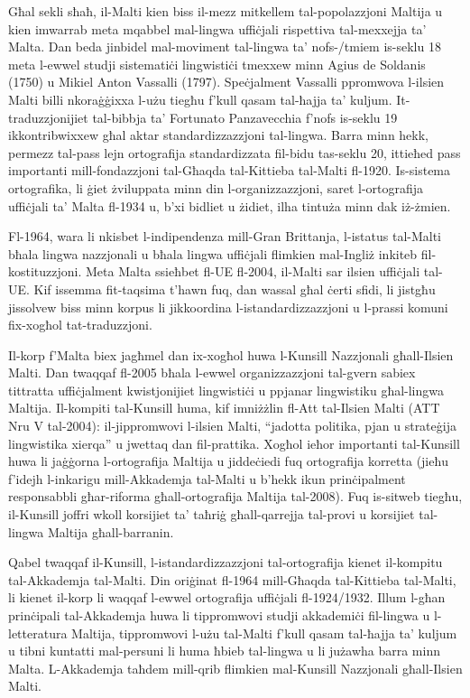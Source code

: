 \documentclass[]{../../metanetpaper}
\begin{document}
\begin{multicols}{2}
Għal sekli sħaħ, il-Malti kien biss il-mezz mitkellem tal-popolazzjoni Maltija u kien imwarrab meta mqabbel mal-lingwa uffiċjali rispettiva tal-mexxejja ta’ Malta. Dan beda jinbidel mal-moviment tal-lingwa ta’ nofs-/tmiem is-seklu 18 meta l-ewwel studji sistematiċi lingwistiċi tmexxew minn Agius de Soldanis (1750) u Mikiel Anton Vassalli (1797). Speċjalment Vassalli ppromwova l-ilsien Malti billi nkoraġġixxa l-użu tiegħu f'kull qasam tal-ħajja ta’ kuljum. It-traduzzjonijiet tal-bibbja ta’ Fortunato Panzavecchia f’nofs is-seklu 19 ikkontribwixxew għal aktar standardizzazzjoni tal-lingwa. Barra minn hekk, permezz tal-pass lejn ortografija standardizzata fil-bidu tas-seklu 20, ittieħed pass  importanti mill-fondazzjoni tal-Għaqda tal-Kittieba tal-Malti fl-1920. Is-sistema ortografika, li ġiet żviluppata minn din l-organizzazzjoni, saret l-ortografija uffiċjali ta’ Malta fl-1934 u, b'xi bidliet u żidiet, ilha tintuża minn dak iż-żmien.

Fl-1964, wara li nkisbet l-indipendenza mill-Gran Brittanja, l-istatus tal-Malti bħala lingwa nazzjonali u bħala lingwa uffiċjali flimkien mal-Ingliż inkiteb fil-kostituzzjoni. Meta Malta ssieħbet fl-UE fl-2004, il-Malti sar ilsien uffiċjali tal-UE. Kif issemma fit-taqsima t’hawn fuq, dan wassal għal ċerti sfidi, li jistgħu jissolvew biss minn korpus li jikkoordina l-istandardizzazzjoni u l-prassi komuni fix-xogħol tat-traduzzjoni.

Il-korp f'Malta biex jagħmel dan ix-xogħol huwa l-Kunsill Nazzjonali għall-Ilsien Malti. Dan twaqqaf fl-2005 bħala l-ewwel organizzazzjoni tal-gvern sabiex tittratta uffiċjalment kwistjonijiet lingwistiċi u ppjanar lingwistiku għal-lingwa Maltija. Il-kompiti tal-Kunsill huma, kif imniżżlin fl-Att tal-Ilsien Malti (ATT Nru V tal-2004): il-jippromwovi l-ilsien Malti, ``jadotta politika, pjan u strateġija lingwistika xierqa'' u jwettaq dan fil-prattika. Xogħol ieħor importanti tal-Kunsill huwa li jaġġorna l-ortografija Maltija u jiddeċiedi fuq ortografija korretta (jieħu f’idejh l-inkarigu mill-Akkademja tal-Malti u b’hekk ikun prinċipalment responsabbli għar-riforma għall-ortografija Maltija tal-2008). Fuq is-sitweb tiegħu, il-Kunsill joffri wkoll korsijiet ta’ taħriġ għall-qarrejja tal-provi u korsijiet tal-lingwa Maltija għall-barranin\cite{Kunsill1}.

Qabel twaqqaf il-Kunsill, l-istandardizzazzjoni tal-ortografija kienet il-kompitu tal-Akkademja tal-Malti. Din oriġinat fl-1964 mill-Għaqda tal-Kittieba tal-Malti, li kienet il-korp li waqqaf l-ewwel ortografija uffiċjali fl-1924/1932. Illum l-għan prinċipali tal-Akkademja huwa li tippromwovi studji akkademiċi fil-lingwa u l-letteratura Maltija, tippromwovi l-użu tal-Malti f’kull qasam tal-ħajja ta’ kuljum u tibni kuntatti mal-persuni li huma ħbieb tal-lingwa u li jużawha barra minn Malta\cite{Akkademja1}. L-Akkademja taħdem mill-qrib flimkien mal-Kunsill Nazzjonali għall-Ilsien Malti.


\end{multicols}
\end{document}

